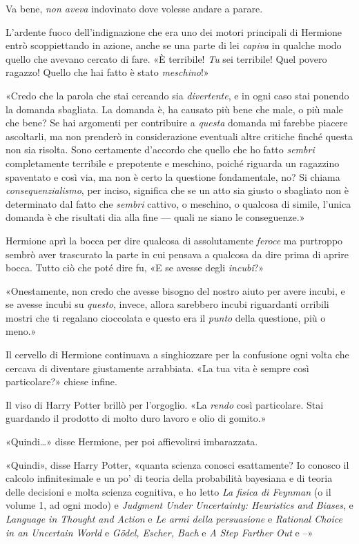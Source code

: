 Va bene, \textit{non aveva} indovinato dove volesse andare a parare.

L’ardente fuoco dell’indignazione che era uno dei motori principali di Hermione entrò scoppiettando in azione, anche se una parte di lei \textit{capiva} in qualche modo quello che avevano cercato di fare. «È terribile! \textit{Tu} sei terribile! Quel povero ragazzo! Quello che hai fatto è stato \textit{meschino}!»

«Credo che la parola che stai cercando sia \textit{divertente}, e in ogni caso stai ponendo la domanda sbagliata. La domanda è, ha causato più bene che male, o più male che bene? Se hai argomenti per contribuire a \textit{questa} domanda mi farebbe piacere ascoltarli, ma non prenderò in considerazione eventuali altre critiche finché questa non sia risolta. Sono certamente d’accordo che quello che ho fatto \textit{sembri} completamente terribile e prepotente e meschino, poiché riguarda un ragazzino spaventato e così via, ma non è certo la questione fondamentale, no? Si chiama \textit{consequenzialismo}, per inciso, significa che se un atto sia giusto o sbagliato non è determinato dal fatto che \textit{sembri} cattivo, o meschino, o qualcosa di simile, l’unica domanda è che risultati dia alla fine — quali ne siano le conseguenze.»

Hermione aprì la bocca per dire qualcosa di assolutamente \textit{feroce} ma purtroppo sembrò aver trascurato la parte in cui pensava a qualcosa da dire prima di aprire bocca. Tutto ciò che poté dire fu, «E se avesse degli \textit{incubi}?»

«Onestamente, non credo che avesse bisogno del nostro aiuto per avere incubi, e se avesse incubi su \textit{questo}, invece, allora sarebbero incubi riguardanti orribili mostri che ti regalano cioccolata e questo era il \textit{punto} della questione, più o meno.»

Il cervello di Hermione continuava a singhiozzare per la confusione ogni volta che cercava di diventare giustamente arrabbiata. «La tua vita è sempre così particolare?» chiese infine.

Il viso di Harry Potter brillò per l’orgoglio. «La \textit{rendo} così particolare. Stai guardando il prodotto di molto duro lavoro e olio di gomito.»

«Quindi…» disse Hermione, per poi affievolirsi imbarazzata.

«Quindi», disse Harry Potter, «quanta scienza conosci esattamente? Io conosco il calcolo infinitesimale e un po’ di teoria della probabilità bayesiana e di teoria delle decisioni e molta scienza cognitiva, e ho letto \textit{La fisica di Feynman} (o il volume 1, ad ogni modo) e \textit{Judgment Under Uncertainty: Heuristics and Biases}, e \textit{Language in Thought and Action} e \textit{Le armi della persuasione} e \textit{Rational Choice in an Uncertain World} e \textit{Gödel, Escher, Bach} e \textit{A Step Farther Out} e –»


